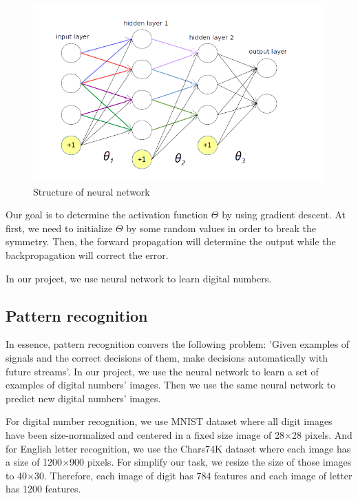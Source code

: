 \documentclass[paper=a4, french, 11pt]{scrartcl}
\begin{document}
\begin{figure}[h]
\begin{center}
	\vspace{-1ex}
   \includegraphics[width=0.75\linewidth]{network.png}
\end{center}
\vspace{-4ex}
\caption{Structure of neural network}
\label{fig:heatmap}
\end{figure}

Our goal is to determine the activation function $\Theta$ by using gradient descent. At first, we need to initialize $\Theta$ by some random values in order to break the symmetry. Then, the forward propagation will determine the output while the backpropagation will correct the error.

In our project, we use neural network to learn digital numbers.

\subsection{Pattern recognition}

In essence, pattern recognition convers the following problem: 'Given examples of signals and the correct decisions of them, make decisions automatically with future streams'. In our project, we use the neural network to learn a set of examples of digital numbers' images. Then we use the same neural network to predict new digital numbers' images. 

For digital number recognition, we use MNIST dataset where all digit images have been size-normalized and centered in a fixed size image of 28$\times$28 pixels. And for English letter recognition, we use the Chars74K dataset where each image has a size of 1200$\times$900 pixels. For simplify our task, we resize the size of those images to 40$\times$30. Therefore, each image of digit has 784 features and each image of letter has 1200 features.
\end{document}
